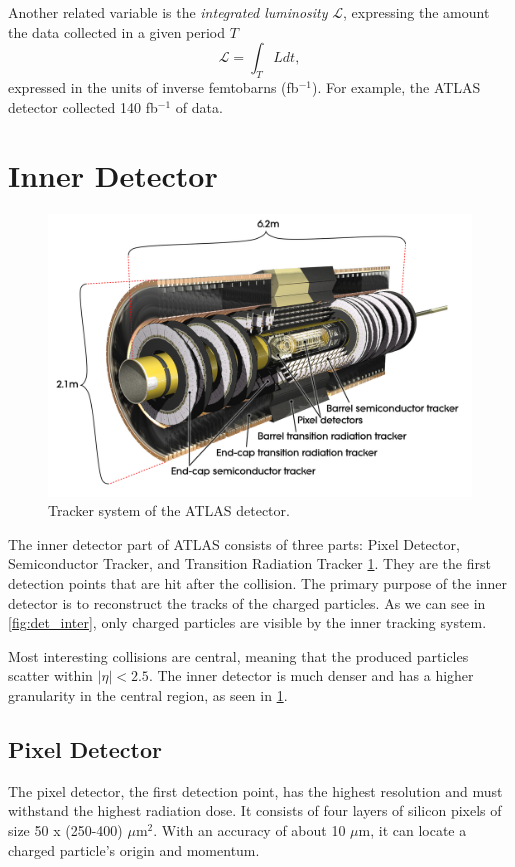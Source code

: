 Another related variable is the \emph{integrated luminosity} $ \mathcal{L}$, expressing the amount the data collected in a given period $T$
\begin{equation}
    \mathcal{L} = \int_{T} L dt,
\end{equation}
expressed in the units of inverse femtobarns (fb$^{-1}$).
For example, the ATLAS detector collected 140 fb$^{-1}$ of data.




\section{Inner Detector}
\label{sec:trackers}
\begin{figure}[htb]
    \centering
    \includegraphics[width=1\linewidth]{src/img/track.jpg}
    \caption{Tracker system of the ATLAS detector.}
    \label{fig:tracker}
\end{figure}
The inner detector part of ATLAS consists of three parts: Pixel Detector, Semiconductor Tracker, and Transition Radiation Tracker \cref{fig:tracker}. 
They are the first detection points that are hit after the collision.
The primary purpose of the inner detector is to reconstruct the tracks of the charged particles.
As we can see in \cref{fig:det_inter}, only charged particles are visible by the inner tracking system.

Most interesting collisions are central, meaning that the produced particles scatter within $|\eta| < 2.5$.
The inner detector is much denser and has a higher granularity in the central region, as seen in \cref{fig:tracker}.

\subsection{Pixel Detector}
The pixel detector, the first detection point, has the highest resolution and must withstand the highest radiation dose.
It consists of four layers of silicon pixels of size 50 x (250-400) $\mu$m$^2$.
With an accuracy of about 10 $\mu$m, it can locate a charged particle's origin and momentum.

